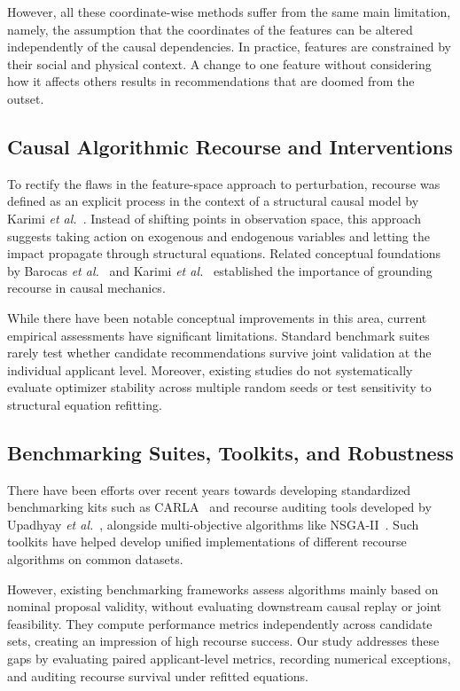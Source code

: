 \documentclass[nolineno]{paper/ieee-access/ieeeaccess}%
\begin{document}
However, all these coordinate-wise methods suffer from the same main limitation, namely, the assumption that the coordinates of the features can be altered independently of the causal dependencies. In practice, features are constrained by their social and physical context. A change to one feature without considering how it affects others results in recommendations that are doomed from the outset.

\subsection{Causal Algorithmic Recourse and Interventions}
To rectify the flaws in the feature-space approach to perturbation, recourse was defined as an explicit process in the context of a structural causal model by Karimi \emph{et al.}~\cite{karimi2021recourse, karimi2020imperfect}. Instead of shifting points in observation space, this approach suggests taking action on exogenous and endogenous variables and letting the impact propagate through structural equations. Related conceptual foundations by Barocas \emph{et al.}~\cite{barocas2020hidden} and Karimi \emph{et al.}~\cite{karimi2022survey} established the importance of grounding recourse in causal mechanics.

While there have been notable conceptual improvements in this area, current empirical assessments have significant limitations. Standard benchmark suites rarely test whether candidate recommendations survive joint validation at the individual applicant level. Moreover, existing studies do not systematically evaluate optimizer stability across multiple random seeds or test sensitivity to structural equation refitting.

\subsection{Benchmarking Suites, Toolkits, and Robustness}
There have been efforts over recent years towards developing standardized benchmarking kits such as CARLA~\cite{pawelczyk2021carla} and recourse auditing tools developed by Upadhyay \emph{et al.}~\cite{upadhyay2021robust}, alongside multi-objective algorithms like NSGA-II~\cite{deb2002nsga, dandl2020multi}. Such toolkits have helped develop unified implementations of different recourse algorithms on common datasets.

However, existing benchmarking frameworks assess algorithms mainly based on nominal proposal validity, without evaluating downstream causal replay or joint feasibility. They compute performance metrics independently across candidate sets, creating an impression of high recourse success. Our study addresses these gaps by evaluating paired applicant-level metrics, recording numerical exceptions, and auditing recourse survival under refitted equations.
\end{document}
